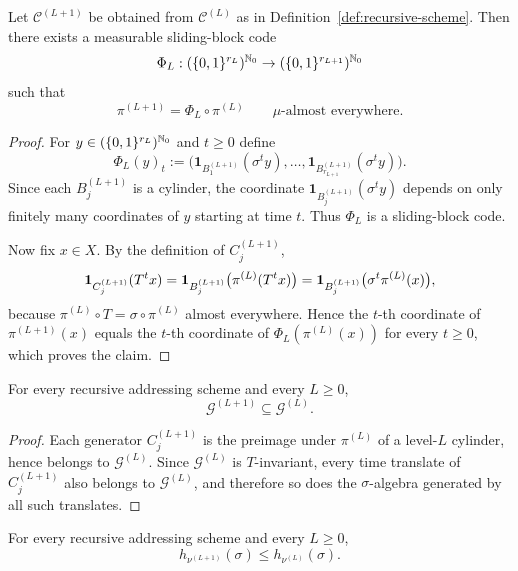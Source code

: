 \begin{proposition}
\label{prop:sliding-block-factor}
Let \(\mathcal{C}^{(L+1)}\) be obtained from \(\mathcal{C}^{(L)}\) as in
Definition~\ref{def:recursive-scheme}.  Then there exists a measurable
sliding-block code
\[
  \Phi_L:(\{0,1\}^{r_L})^{\mathbb{N}_0}
  \to (\{0,1\}^{r_{L+1}})^{\mathbb{N}_0}
\]
such that
\[
  \pi^{(L+1)} = \Phi_L\circ \pi^{(L)}
  \qquad \mu\text{-almost everywhere}.
\]
\end{proposition}

\begin{proof}
For \(y\in (\{0,1\}^{r_L})^{\mathbb{N}_0}\) and \(t\geq 0\) define
\[
  \Phi_L(y)_t
  := \bigl(
      \mathbf{1}_{B^{(L+1)}_1}(\sigma^t y),\ldots,
      \mathbf{1}_{B^{(L+1)}_{r_{L+1}}}(\sigma^t y)
     \bigr).
\]
Since each \(B^{(L+1)}_j\) is a cylinder, the coordinate
\(\mathbf{1}_{B^{(L+1)}_j}(\sigma^t y)\) depends on only finitely many
coordinates of \(y\) starting at time \(t\).  Thus \(\Phi_L\) is a
sliding-block code.

Now fix \(x\in X\).  By the definition of \(C^{(L+1)}_j\),
\[
  \mathbf{1}_{C^{(L+1)}_j}(T^t x)
  = \mathbf{1}_{B^{(L+1)}_j}\bigl(\pi^{(L)}(T^t x)\bigr)
  = \mathbf{1}_{B^{(L+1)}_j}\bigl(\sigma^t \pi^{(L)}(x)\bigr),
\]
because \(\pi^{(L)}\circ T=\sigma\circ \pi^{(L)}\) almost everywhere.
Hence the \(t\)-th coordinate of \(\pi^{(L+1)}(x)\) equals the \(t\)-th
coordinate of \(\Phi_L(\pi^{(L)}(x))\) for every \(t\geq 0\), which
proves the claim.
\end{proof}

\begin{corollary}
\label{cor:sigma-nonexpansion}
For every recursive addressing scheme and every \(L\geq 0\),
\[
  \mathcal{G}^{(L+1)} \subseteq \mathcal{G}^{(L)}.
\]
\end{corollary}

\begin{proof}
Each generator \(C^{(L+1)}_j\) is the preimage under \(\pi^{(L)}\) of a
level-\(L\) cylinder, hence belongs to \(\mathcal{G}^{(L)}\).  Since
\(\mathcal{G}^{(L)}\) is \(T\)-invariant, every time translate of
\(C^{(L+1)}_j\) also belongs to \(\mathcal{G}^{(L)}\), and therefore so
does the \(\sigma\)-algebra generated by all such translates.
\end{proof}

\begin{corollary}
\label{cor:entropy-monotonicity}
For every recursive addressing scheme and every \(L\geq 0\),
\[
  h_{\nu^{(L+1)}}(\sigma)\leq h_{\nu^{(L)}}(\sigma).
\]
\end{corollary}

